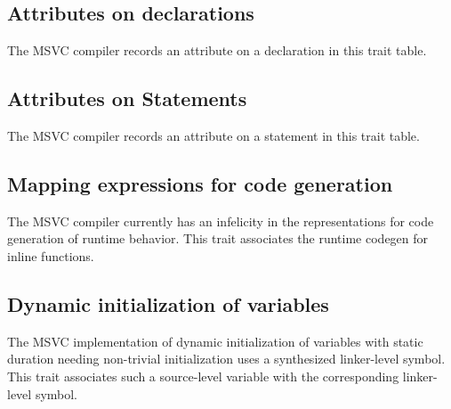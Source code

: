 

\subsection{Attributes on declarations}
\label{sec:ifc-msvc-decl-attr-trait}

The MSVC compiler records an attribute on a declaration in this trait table.




\subsection{Attributes on Statements}
\label{sec:ifc-msvc-stmt-attr-trait}

The MSVC compiler records an attribute on a statement in this trait table.




\subsection{Mapping expressions for code generation}
\label{sec:ifc-msvc-codegen-mapping-trait}

The MSVC compiler currently has an infelicity in the representations for code generation of runtime behavior.
This trait associates the runtime codegen for inline functions.




\subsection{Dynamic initialization of variables}
\label{sec:ifc-msvc-dynamic-init-trait}

The MSVC implementation of dynamic initialization of variables with static duration needing non-trivial initialization uses a synthesized linker-level symbol.
This trait associates such a source-level variable with the corresponding linker-level symbol.


